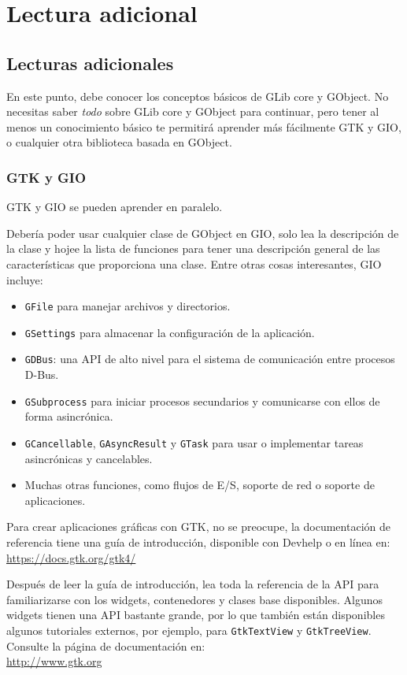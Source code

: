 \part{Lectura adicional \label{further-reading}}

\chapter{Lecturas adicionales}

En este punto, debe conocer los conceptos básicos de GLib core y GObject. No necesitas saber \emph{todo} sobre GLib core y GObject para continuar, pero tener al menos un conocimiento básico te permitirá aprender más fácilmente GTK y GIO, o cualquier otra biblioteca basada en GObject.

\section{GTK y GIO}
GTK y GIO se pueden aprender en paralelo.

Debería poder usar cualquier clase de GObject en GIO, solo lea la descripción de la clase y hojee la lista de funciones para tener una descripción general de las características que proporciona una clase. Entre otras cosas interesantes, GIO incluye:
\begin{itemize}
  \item \lstinline{GFile} para manejar archivos y directorios.
  \item \lstinline{GSettings} para almacenar la configuración de la aplicación.
  \item \lstinline{GDBus}: una API de alto nivel para el sistema de comunicación entre procesos D-Bus.
  \item \lstinline{GSubprocess} para iniciar procesos secundarios y comunicarse con ellos de forma asincrónica.
  \item \lstinline{GCancellable}, \lstinline{GAsyncResult} y \lstinline{GTask} para usar o implementar tareas asincrónicas y cancelables.
  \item Muchas otras funciones, como flujos de E/S, soporte de red o soporte de aplicaciones.
\end{itemize}

Para crear aplicaciones gráficas con GTK, no se preocupe, la documentación de referencia tiene una guía de introducción, disponible con Devhelp o en línea en: \\
\url{https://docs.gtk.org/gtk4/}

Después de leer la guía de introducción, lea toda la referencia de la API para familiarizarse con los widgets, contenedores y clases base disponibles. Algunos widgets tienen una API bastante grande, por lo que también están disponibles algunos tutoriales externos, por ejemplo, para \lstinline{GtkTextView} y \lstinline{GtkTreeView}. Consulte la página de documentación en: \\
\url{http://www.gtk.org}


